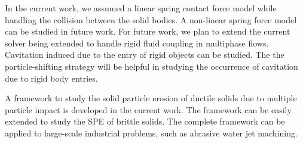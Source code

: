 In the current work, we assumed a linear spring contact force model while
handling the collision between the solid bodies. A non-linear spring force model
can be studied in future work. For future work, we plan to extend the current
solver being extended to handle rigid fluid coupling in multiphase flows.
Cavitation induced due to the entry of rigid objects can be studied. The
the particle-shifting strategy will be helpful in studying the occurrence of
cavitation due to rigid body entries.


A framework to study the solid particle erosion of ductile solids due to multiple
particle impact is developed in the current work. The framework can be easily
extended to study the SPE of brittle solids. The complete framework can be applied
to large-scale industrial problems, such as abrasive water jet machining.

